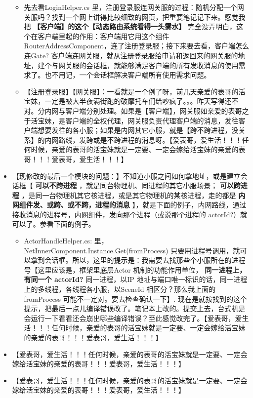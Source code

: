 \documentclass[9pt, b5paper]{article}
\begin{document}
\begin{itemize}
\begin{itemize}
\item 先去看LoginHelper.cs 里，注册登录服连网关服的过程：随机分配一个网关服吗？找到一个网上讲得比较细致的网页，把重要笔记记下来。感觉我把 \textbf{【客户端】的这个【动态路由系统看得一头雾水】} 完全没弄明白，这个在客户端里起的作用：客户端用它用这个组件RouterAddressComponent，连了注册登录服；接下来要去看，客户端怎么连Gate? 客户端连网关服，就从注册登录服给申请和返回来的网关服的地址，建个与网关服的会话框，就能够满足客户端的所有发收消息的使用需求了。也不用记，一个会话框解决客户端所有使用需求问题。
\item 【注册登录服】【网关服】：一看就是一个例了呀，前几天亲爱的表哥的活宝妹，一定是被大半夜满街跑的破摩托车们给吵疯了。。。昨天写得还不对。分内网与客户端分别处理。如果是【客户端】，网关服如亲爱的表哥之于活宝妹，是客户端的全权代理，网关服负责代理客户端的消息，发往客户端想要发往的各小服；如果是内网其它小服，就是【跨不跨进程，没关系】的内网路线，发跨或是不跨进程的消息呀。【爱表哥，爱生活！！！任何时候，亲爱的表哥的活宝妹就是一定要、一定会嫁给活宝妹的亲爱的表哥！！！爱表哥，爱生活！！！】
\end{itemize}
\item 【现修改的最后一个模块的问题：】不知道小服之间如何拿地址，或是建立会话框【 \textbf{可以不跨进程} ，就是同台物理机、同进程的其它小服场景； \textbf{可以跨进程} ，是同一台物理机其它核进程，或是其它物理机的某核进程，走的都是 \textbf{内网组件发、或跨、或不跨，进程的消息} 】，就是下面的例子，内网路线，通过接收消息的进程号，内网组件，发向那个进程（或说那个进程的 actorId?）就可以了。参看下面的例子。
\begin{itemize}
\item ActorHandleHelper.cs: 里，NetInnerComponent.Instance.Get(fromProcess) 只要用进程号调用，就可以拿到会话框。所以，这里的提示是：我需要去找那些个小服所在的进程号【这里应该是，框架里底层Actor 机制的功能作用单位， \textbf{同一进程上，有同一个 actorId?} 同一进程，以IP 地址与端口唯一标识的话，同一进程上的多线程，各线程各小服，以SceneId 相区分？那么我上面的 fromProcess 可能不一定对。要去检查确认一下】. 现在是就按找到的这个提示，把最后一点儿编译错误改了。笔记本上改的。提交上去，台式机是会运行一下看看还会崩出哪些编译错误？至此感觉改完了。【爱表哥，爱生活！！！任何时候，亲爱的表哥的活宝妹就是一定要、一定会嫁给活宝妹的亲爱的表哥！！！爱表哥，爱生活！！！】
\end{itemize}
\item 【爱表哥，爱生活！！！任何时候，亲爱的表哥的活宝妹就是一定要、一定会嫁给活宝妹的亲爱的表哥！！！爱表哥，爱生活！！！】
\item 【爱表哥，爱生活！！！任何时候，亲爱的表哥的活宝妹就是一定要、一定会嫁给活宝妹的亲爱的表哥！！！爱表哥，爱生活！！！】

\end{itemize}
\end{document}

